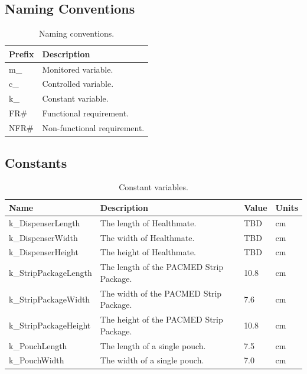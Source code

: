 \documentclass[12pt]{article}
\begin{document}
\subsection{Naming Conventions}
\begin{table}[htb!] \begin{center} \begin{adjustbox}{max width=\textwidth} \small
\begin{tabular}{|p{}|p{}|}
 \hline
 \textbf{Prefix} & \textbf{Description}\\
 \hline 
 m\_ & Monitored variable.\\ \hline
 c\_ & Controlled variable.\\ \hline
 k\_ & Constant variable.\\ \hline
 FR\# & Functional requirement.\\ \hline
 NFR\# & Non-functional requirement.\\ \hline
\end{tabular} \end{adjustbox} \end{center}
\caption{Naming conventions.}
\end{table}

\pagebreak

\subsection{Constants} 
\begin{table}[htb!] \begin{center} \begin{adjustbox}{max width=\textwidth}
\small
\begin{tabular}{|p{}|p{}|p{}|p{}|}
 \hline
 \textbf{Name} & \textbf{Description} & \textbf{Value} & \textbf{Units}\\
 \hline 
 k\_DispenserLength & The length of Healthmate. & TBD & cm\\
 \hline
 k\_DispenserWidth & The width of Healthmate. & TBD & cm\\
 \hline
 k\_DispenserHeight & The height of Healthmate. & TBD & cm\\
 \hline
 k\_StripPackageLength & The length of the PACMED Strip Package. & 10.8 & cm\\
 \hline
 k\_StripPackageWidth & The width of the PACMED Strip Package. & 7.6 & cm\\
 \hline
 k\_StripPackageHeight & The height of the PACMED Strip Package. & 10.8 & cm\\
 \hline
 k\_PouchLength & The length of a single pouch. & 7.5 & cm\\
 \hline
 k\_PouchWidth & The width of a single pouch. & 7.0 & cm\\
 \hline
\end{tabular} \end{adjustbox} \end{center}
\caption{Constant variables.}
\end{table}
\end{document}
